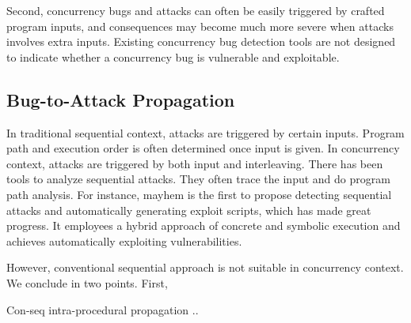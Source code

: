 Second, concurrency bugs and attacks can often be easily
triggered by crafted program inputs, and consequences may 
become much more severe when attacks involves extra inputs.  
Existing concurrency bug detection tools are not designed to indicate 
whether a concurrency bug is vulnerable and exploitable.


\subsection{Bug-to-Attack Propagation}

In traditional sequential context, attacks are triggered by certain inputs. 
Program path and execution order is often 
determined once input is given. 
In concurrency context, attacks are triggered by both input and interleaving\cite{con-bugs,con:hotpar12}. 
There has been tools to analyze sequential attacks. 
They often trace the input and do program path analysis. 
For instance, mayhem\cite{mayhem:cmu} is the first to propose detecting 
sequential attacks and automatically generating exploit scripts, which has made great progress. 
It employees a hybrid 
approach of concrete and symbolic execution and achieves automatically 
exploiting vulnerabilities. 

However, conventional sequential approach is not suitable in concurrency context. 
We conclude in two points. First,  


Con-seq intra-procedural propagation .. 




